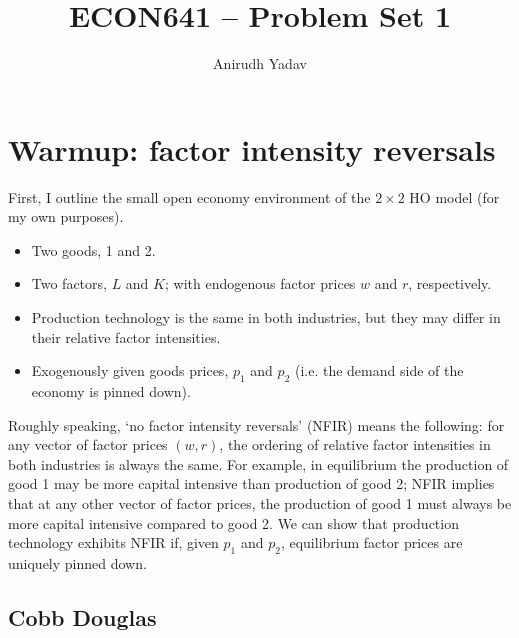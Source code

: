 \documentclass[12pt]{article}
\title{ECON641 -- Problem Set 1}
\author{Anirudh Yadav}
\begin{document}
\maketitle

\setcounter{tocdepth}{1}
\tableofcontents

\newpage

\section{Warmup: factor intensity reversals}
First, I outline the small open economy environment of the $2\times 2$ HO model (for my own purposes). 
\begin{itemize}
\item Two goods, 1 and 2.
\item Two factors, $L$ and $K$; with endogenous factor prices $w$ and $r$, respectively.
\item Production technology is the same in both industries, but they may differ in their relative factor intensities.
\item Exogenously given goods prices, $p_1$ and $p_2$ (i.e. the demand side of the economy is pinned down).
\end{itemize}
Roughly speaking, `no factor intensity reversals' (NFIR) means the following: for any vector of factor prices $(w,r)$, the ordering of relative factor intensities in both industries is always the same. For example, in equilibrium the production of good 1 may be more capital intensive than production of good 2; NFIR implies that at any other vector of factor prices, the production of good 1 must always be more capital intensive compared to good 2. We can show that production technology exhibits NFIR if, given $p_1$ and $p_2$, equilibrium factor prices are uniquely pinned down.\\

\subsection{Cobb Douglas}
\end{document}
